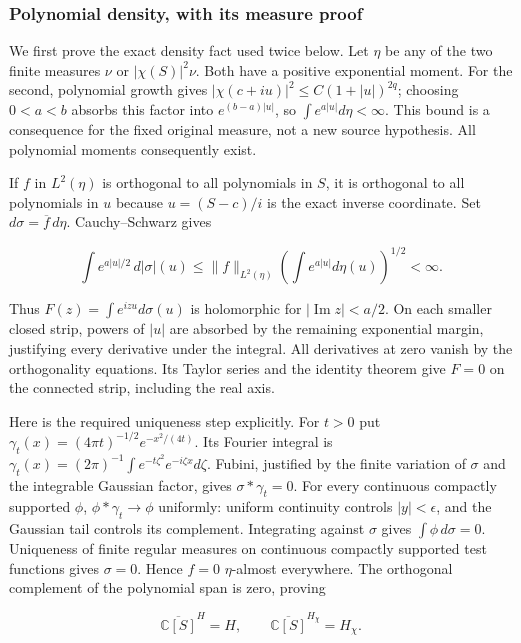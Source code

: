 \subsubsection{Polynomial density, with its measure proof}\label{polynomial-density-with-its-measure-proof}

We first prove the exact density fact used twice below. Let \(\eta\) be any of the two finite measures \(\nu\) or \(|\chi(S)|^2\nu\). Both have a positive exponential moment. For the second, polynomial growth gives \(|\chi(c+iu)|^2\le C(1+|u|)^{2q}\); choosing \(0<a<b\) absorbs this factor into \(e^{(b-a)|u|}\), so \(\int e^{a|u|}d\eta<\infty\). This bound is a consequence for the fixed original measure, not a new source hypothesis. All polynomial moments consequently exist.

If \(f\) in \(L^2(\eta)\) is orthogonal to all polynomials in \(S\), it is orthogonal to all polynomials in \(u\) because \(u=(S-c)/i\) is the exact inverse coordinate. Set \(d\sigma=\overline f\,d\eta\). Cauchy--Schwarz gives

\[
\int e^{a|u|/2}\,d|\sigma|(u)
\le \|f\|_{L^2(\eta)}\left(\int e^{a|u|}d\eta(u)\right)^{1/2}<\infty.
\tag{CR4}
\]

Thus \(F(z)=\int e^{izu}d\sigma(u)\) is holomorphic for \(|\operatorname{Im}z|<a/2\). On each smaller closed strip, powers of \(|u|\) are absorbed by the remaining exponential margin, justifying every derivative under the integral. All derivatives at zero vanish by the orthogonality equations. Its Taylor series and the identity theorem give \(F=0\) on the connected strip, including the real axis.

Here is the required uniqueness step explicitly. For \(t>0\) put \(\gamma_t(x)=(4\pi t)^{-1/2}e^{-x^2/(4t)}\). Its Fourier integral is \(\gamma_t(x)=(2\pi)^{-1}\int e^{-t\zeta^2}e^{-i\zeta x}d\zeta\). Fubini, justified by the finite variation of \(\sigma\) and the integrable Gaussian factor, gives \(\sigma*\gamma_t=0\). For every continuous compactly supported \(\phi\), \(\phi*\gamma_t\to\phi\) uniformly: uniform continuity controls \(|y|<\epsilon\), and the Gaussian tail controls its complement. Integrating against \(\sigma\) gives \(\int\phi\,d\sigma=0\). Uniqueness of finite regular measures on continuous compactly supported test functions gives \(\sigma=0\). Hence \(f=0\) \(\eta\)-almost everywhere. The orthogonal complement of the polynomial span is zero, proving

\[
\overline{\mathbb C[S]}^{H}=H,\qquad
\overline{\mathbb C[S]}^{H_\chi}=H_\chi.
\tag{CR5}
\]

